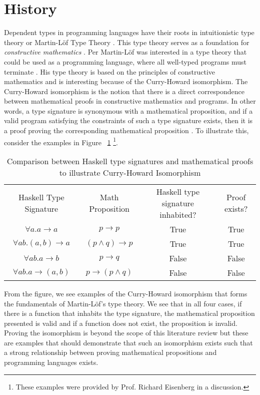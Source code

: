 \section{History}

Dependent types in programming languages have their roots in intuitionistic type
theory or Martin-L\"{o}f Type Theory \cite{intro_martin_lof,ml_type_theory}.
This type theory serves as a foundation for \textit{constructive mathematics}
\cite{martin_lof}. Per Martin-L\"{o}f was interested in a type theory that could
be used as a programming language, where all well-typed programs must terminate
\cite{ml_type_theory}. His type theory is based on the principles of
constructive mathematics and is interesting because of the Curry-Howard
isomorphism. The Curry-Howard isomorphism is the notion that there is a direct
correspondence between mathematical proofs in constructive mathematics and
programs. In other words, a type signature is synonymous with a mathematical
proposition, and if a valid program satisfying the constraints of such a type
signature exists, then it is a proof proving the corresponding mathematical
proposition \cite{martin_lof,ml_type_theory}. To illustrate this, consider the
examples in Figure ~\ref{ml_type_theory_examples}
\footnote{These examples were provided by Prof. Richard Eisenberg in a
discussion.}. 

\begin{table}[h]
    \label{ml_type_theory_examples}
    \begin{tabular}{|c|c|c|c|}
        Haskell Type Signature & Math Proposition & Haskell type signature inhabited? & Proof exists? \\
        $\forall a. a \rightarrow a$ & $p \rightarrow p$ & True & True \\
        $\forall ab. (a,b) \rightarrow a$ & $ (p \wedge q) \rightarrow p$ & True & True \\
        $\forall ab. a \rightarrow b$ & $p\rightarrow q$ & False & False \\
        $\forall ab. a \rightarrow (a,b)$ & $p \rightarrow (p\wedge q)$ & False & False 
    \end{tabular}
    \caption{Comparison between Haskell type signatures and mathematical proofs to illustrate Curry-Howard Isomorphism}
\end{table}

From the figure, we see examples of the Curry-Howard isomorphism that forms the
fundamentals of Martin-L\"{o}f's type theory. We see that in all four cases, if
there is a function that inhabits the type signature, the mathematical
proposition presented is valid and if a function does not exist, the proposition
is invalid. Proving the isomorphism is beyond the scope of this literature
review but these are examples that should demonstrate that such an isomorphism
exists such that a strong relationship between proving mathematical propositions
and programming languages exists.

